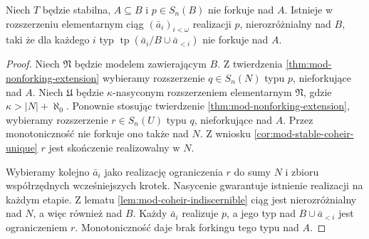\begin{lemat}
\label{lem:mod-nonforking-indiscernible-sequence}
Niech $T$ będzie stabilna, $A\subseteq B$
i $p\in S_n(B)$ nie forkuje nad $A$.
Istnieje w rozszerzeniu elementarnym
ciąg $(\bar a_i)_{i<\omega}$ realizacji $p$,
nierozróżnialny nad $B$, taki że dla każdego $i$
typ
$\operatorname{tp}(\bar a_i/B\cup\bar a_{<i})$
nie forkuje nad $A$.
\end{lemat}
\begin{proof}
Niech $\mathfrak N$ będzie modelem zawierającym
$B$. Z twierdzenia
\ref{thm:mod-nonforking-extension}
wybieramy rozszerzenie $q\in S_n(N)$
typu $p$, nieforkujące nad $A$.
Niech $\mathfrak U$ będzie $\kappa$-nasyconym
rozszerzeniem elementarnym $\mathfrak N$,
gdzie $\kappa>|N|+\aleph_0$.
Ponownie stosując twierdzenie
\ref{thm:mod-nonforking-extension},
wybieramy rozszerzenie $r\in S_n(U)$
typu $q$, nieforkujące nad $A$.
Przez monotoniczność nie forkuje ono
także nad $N$.
Z wniosku \ref{cor:mod-stable-coheir-unique}
$r$ jest skończenie realizowalny w $N$.

Wybieramy kolejno $\bar a_i$ jako realizację
ograniczenia $r$ do sumy $N$ i zbioru
współrzędnych wcześniejszych krotek.
Nasycenie gwarantuje istnienie realizacji
na każdym etapie.
Z lematu \ref{lem:mod-coheir-indiscernible}
ciąg jest nierozróżnialny nad $N$,
a więc również nad $B$.
Każdy $\bar a_i$ realizuje $p$,
a jego typ nad $B\cup\bar a_{<i}$
jest ograniczeniem $r$.
Monotoniczność daje brak forkingu
tego typu nad $A$.
\end{proof}


